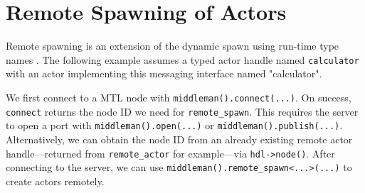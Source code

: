 \section{Remote Spawning of Actors \experimental}
\label{remote-spawn}

Remote spawning is an extension of the dynamic spawn using run-time type names
. The following example assumes a typed actor handle
named \lstinline^calculator^ with an actor implementing this messaging
interface named "calculator".


We first connect to a MTL node with \lstinline^middleman().connect(...)^. On
success, \lstinline^connect^ returns the node ID we need for
\lstinline^remote_spawn^. This requires the server to open a port with
\lstinline^middleman().open(...)^ or \lstinline^middleman().publish(...)^.
Alternatively, we can obtain the node ID from an already existing remote actor
handle---returned from \lstinline^remote_actor^ for example---via
\lstinline^hdl->node()^. After connecting to the server, we can use
\lstinline^middleman().remote_spawn<...>(...)^ to create actors remotely.
